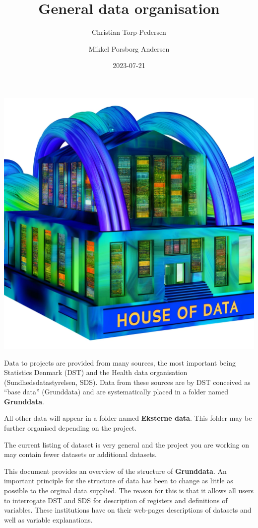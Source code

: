 \documentclass[
]{article}
\title{General data organisation}
\author{Christian Torp-Pedersen \and Mikkel Porsborg Andersen}
\date{2023-07-21}
\begin{document}
\maketitle

\includegraphics{./houseOfData.webp} \newpage \tableofcontents \newpage

Data to projects are provided from many sources, the most important
being Statistics Denmark (DST) and the Health data organisation
(Sundhedsdatastyrelsen, SDS). Data from these sources are by DST
conceived as ``base data'' (Grunddata) and are systematically placed in
a folder named \textbf{Grunddata}.

All other data will appear in a folder named \textbf{Eksterne data}.
This folder may be further organised depending on the project.

The current listing of dataset is very general and the project you are
working on may contain fewer datasets or additional datasets.

This document provides an overview of the structure of
\textbf{Grunddata}. An important principle for the structure of data has
been to change as little as possible to the orginal data supplied. The
reason for this is that it allows all users to interrogate DST and SDS
for description of registers and definitions of variables. These
institutions have on their web-pages descriptions of datasets and well
as variable explanations.
\end{document}

